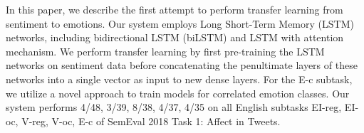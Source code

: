 In this paper, we describe the first attempt to perform transfer learning from sentiment to emotions. Our system employs Long Short-Term Memory (LSTM) networks, including bidirectional LSTM (biLSTM) and LSTM with attention mechanism. We perform transfer learning by first pre-training the LSTM networks on sentiment data before concatenating the penultimate layers of these networks into a single vector as input to new dense layers. For the E-c subtask, we utilize a novel approach to train models for correlated emotion classes. Our system performs 4/48, 3/39, 8/38, 4/37, 4/35 on all English subtasks EI-reg, EI-oc, V-reg, V-oc, E-c of SemEval 2018 Task 1: Affect in Tweets.
